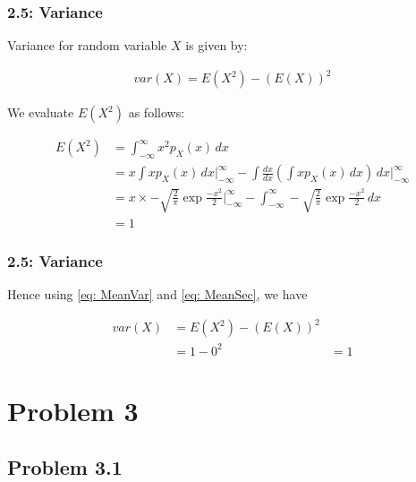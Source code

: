\documentclass{beamer}
\begin{document}
\begin{frame}
	\frametitle{2.5: Variance}
	Variance for random variable $X$ is given by:

	\begin{align}
		var(X) = E(X^2) - (E(X))^2
		\label{eq: MeanVar}
	\end{align}

	We evaluate $E(X^2)$ as follows:

	\begin{align}
		E(X^2) &= \int^{\infty}_{-\infty} x^2 p_X(x) \,dx \\
		&= x \int x p_X(x) \,dx \Big|^{\infty}_{-\infty} - \int \frac{dx}{dx} (\int x p_X(x) \,dx) \,dx\Big|^{\infty}_{-\infty} \\
		&= x \times -\sqrt{\frac{2}{\pi}} \exp{\frac{-x^2}{2}}\Big|_{-\infty}^{\infty} - \int^{\infty}_{-\infty} -\sqrt{\frac{2}{\pi}} \exp{\frac{-x^2}{2}} \,dx \\
		&= 1
		\label{eq: MeanSec}
	\end{align}

\end{frame}

\begin{frame}
	\frametitle{2.5: Variance}
	Hence using \eqref{eq: MeanVar} and \eqref{eq: MeanSec}, we have

	\begin{align}
		var(X) &= E(X^2) - (E(X))^2 \\
		&= 1 - 0^2
		&= 1
	\end{align}
\end{frame}

	
\section{Problem 3}

\subsection{Problem 3.1}
\end{document}
